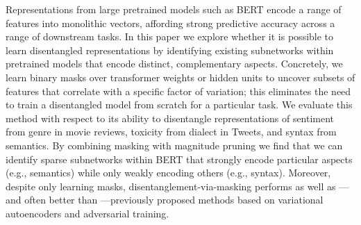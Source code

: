 Representations from large pretrained models such as BERT encode a range of features into monolithic vectors, affording strong predictive accuracy across a range of downstream tasks. In this paper we explore whether it is possible to learn disentangled representations by identifying existing subnetworks within pretrained models that encode distinct, complementary aspects. Concretely, we learn binary masks over transformer weights or hidden units to uncover subsets of features that correlate with a specific factor of variation; this eliminates the need to train a disentangled model from scratch for a particular task. We evaluate this method with respect to its ability to disentangle representations of sentiment from genre in movie reviews, toxicity from dialect in Tweets, and syntax from semantics. By combining masking with magnitude pruning we find that we can identify sparse subnetworks within BERT that strongly encode particular aspects (e.g., semantics) while only weakly encoding others (e.g., syntax). Moreover, despite only learning masks, disentanglement-via-masking performs as well as — and often better than —previously proposed methods based on variational autoencoders and adversarial training.
